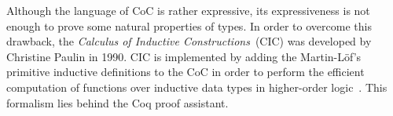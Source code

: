 \documentclass[article]{aaltoseries}
\begin{document}
%

Although the language of CoC is rather expressive, its expressiveness is not enough to prove some natural properties of types. In order to overcome this drawback, the \textit{Calculus of Inductive Constructions}~(CIC) was developed by Christine Paulin in 1990. CIC is implemented by adding the Martin-Löf's primitive inductive definitions to the CoC in order to perform the efficient computation of functions over inductive data types in higher-order logic~\cite{Paulin15}. This formalism lies behind the Coq proof assistant.




		
\end{document}
